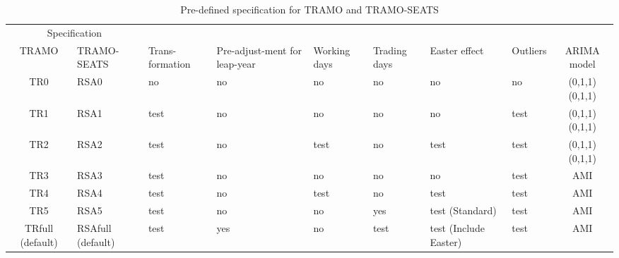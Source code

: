 \documentclass[article]{jss}
\begin{document}
\begin{table}

\caption{\label{tab:unnamed-chunk-3}\label{tab:pre_def_ts}Pre-defined specification for TRAMO and TRAMO-SEATS}
\centering
\fontsize{7}{9}\selectfont
\begin{tabular}[t]{c>{\centering\arraybackslash}p{}>{\centering\arraybackslash}p{}>{\centering\arraybackslash}p{1.5cm}>{\centering\arraybackslash}p{0.9cm}>{\centering\arraybackslash}p{0.9cm}>{\centering\arraybackslash}p{1.5cm}>{\centering\arraybackslash}p{0.9cm}c}
\toprule
\multicolumn{2}{c}{Specification} & \multicolumn{1}{c}{} \\
\cmidrule(l{2pt}r{2pt}){1-2}
TRAMO & TRAMO-SEATS & Trans-formation & Pre-adjust-ment for leap-year & Working days & Trading days & Easter effect & Outliers & ARIMA model\\
\midrule
TR0 & RSA0 & no & no & no & no & no & no & (0,1,1)(0,1,1)\\
TR1 & RSA1 & test & no & no & no & no & test & (0,1,1)(0,1,1)\\
TR2 & RSA2 & test & no & test & no & test & test & (0,1,1)(0,1,1)\\
TR3 & RSA3 & test & no & no & no & no & test & AMI\\
TR4 & RSA4 & test & no & test & no & test & test & AMI\\
\addlinespace
TR5 & RSA5 & test & no & no & yes & test (Standard) & test & AMI\\
TRfull (default) & RSAfull (default) & test & yes & no & test & test (Include Easter) & test & AMI\\
\bottomrule
\end{tabular}
\end{table}
\end{document}
